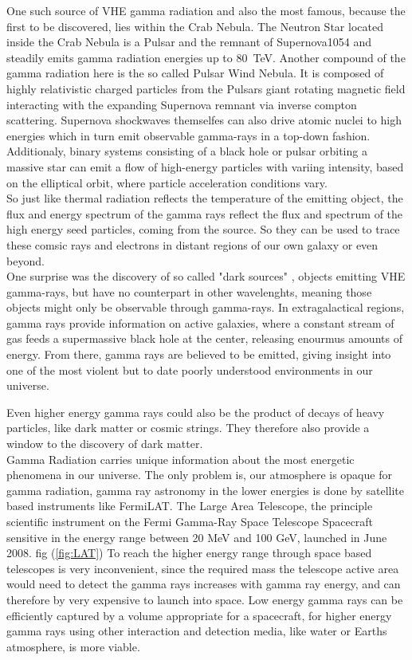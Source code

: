 \documentclass[12pt,article,type=msc,colorback,accentcolor=tud9c]{tudthesis}
\begin{document}
One such source of VHE gamma radiation and also the most famous, because the first to be discovered, lies within the Crab Nebula. The Neutron Star located inside the Crab Nebula is a Pulsar and the remnant of Supernova1054 and steadily emits gamma radiation energies up to 80~TeV. Another compound of the gamma radiation here is the so called Pulsar Wind Nebula. It is composed of highly relativistic charged particles from the Pulsars giant rotating magnetic field interacting with the expanding Supernova remnant via inverse compton scattering. Supernova shockwaves themselfes can also drive atomic nuclei to high energies which in turn emit observable gamma-rays in a top-down fashion. Additionaly, binary systems consisting of a black hole or pulsar orbiting a massive star can emit a flow of high-energy particles with variing intensity, based on the elliptical orbit, where particle acceleration conditions vary.\\
So just like thermal radiation reflects the temperature of the emitting object, the flux and energy spectrum of the gamma rays reflect the flux and spectrum of the high energy seed particles, coming from the source. So they can be used to trace these comsic rays and electrons in distant regions of our own galaxy or even beyond. \\
One surprise was the discovery of so called "dark sources" , objects emitting VHE gamma-rays, but have no counterpart in other wavelenghts, meaning those objects might only be observable through gamma-rays. In extragalactical regions, gamma rays provide information on active galaxies, where a constant stream of gas feeds a supermassive black hole at the center, releasing enourmus amounts of energy. From there, gamma rays are believed to be emitted, giving insight into one of the most violent but to date poorly understood environments in our universe. 

Even higher energy gamma rays could also be the product of decays of heavy particles, like dark matter or cosmic strings. They therefore also provide a window to the discovery of dark matter.\\

Gamma Radiation carries unique information about the most energetic phenomena in our universe. 
The only problem is, our atmosphere is opaque for gamma radiation, gamma ray astronomy in the lower energies is done by satellite based instruments like FermiLAT. The Large Area Telescope, the principle scientific instrument on the Fermi Gamma-Ray Space Telescope Spacecraft sensitive in the energy range between 20 MeV and 100 GeV, launched in June 2008. fig (\ref{fig:LAT}) To reach the higher energy range through space based telescopes is very inconvenient, since the required mass the telescope active area would need to detect the gamma rays increases with gamma ray energy, and can therefore by very expensive to launch into space. Low energy gamma rays can be efficiently captured by a volume appropriate for a spacecraft, for higher energy gamma rays using other interaction and detection media, like water or Earths atmosphere, is more viable.
\end{document}
